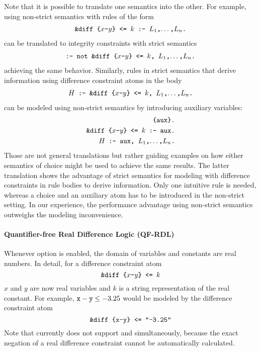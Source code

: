 Note that it is possible to translate one semantics into the other.
For example, using non-strict semantics with rules of the form 
  \begin{align*}
    \texttt{\&diff\text{ }\{$x$-$y$\}\text{ }<=\text{ }$k$ :- $L_1$,$\dots$,$L_n$.}
  \end{align*}
can be translated to integrity constraints with strict semantics
  \begin{align*}
    \texttt{:- not \&diff\text{ }\{$x$-$y$\}\text{ }<=\text{ }$k$, $L_1$,$\dots$,$L_n$.}
  \end{align*}
achieving the same behavior.
Similarly, rules in strict semantics that derive information using difference constraint atoms in the body
  \begin{align*}
    \texttt{$H$ :- \&diff\text{ }\{$x$-$y$\}\text{ }<=\text{ }$k$, $L_1$,$\dots$,$L_n$.}
  \end{align*}
can be modeled using non-strict semantics by introducing auxiliary variables:
  \begin{align*}
    \texttt{\{aux\}.}\\
    \texttt{\&diff\text{ }\{$x$-$y$\}\text{ }<=\text{ }$k$ :- aux.}\\
    \texttt{$H$ :- aux, $L_1$,$\dots$,$L_n$.}
  \end{align*}
Those are not general translations but rather guiding examples on how either semantics of choice might be used to achieve the same results.
The latter translation shows the advantage of strict semantics for modeling with difference constraints in rule bodies to derive information.
Only one intuitive rule is needed, whereas a choice and an auxiliary atom has to be introduced in the non-strict setting.
In our experience, the performance advantage using non-strict semantics outweighs the modeling inconvenience.

\paragraph{Quantifier-free Real Difference Logic (QF-RDL)}

Whenever option  is enabled, the domain of variables and constants are real numbers.
In detail, for a difference constraint atom
 $$
    \texttt{\&diff\text{ }\{$x$-$y$\}\text{ }<=\text{ }$k$}
 $$
 $x$ and $y$ are now real variables and $k$ is a string representation of the real constant.
For example, $\texttt{x}-\texttt{y}\leq -3.25$ would be modeled by the difference constraint atom
 $$
    \texttt{\&diff\text{ }\{x-y\}\text{ }<=\text{ }"-3.25"}
 $$
Note that  currently does not support  and  simultaneously,
because the exact negation of a real difference constraint cannot be automatically calculated.

